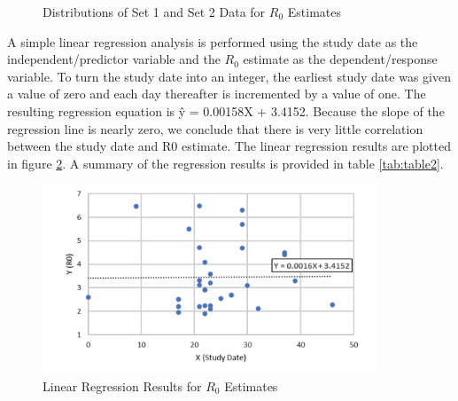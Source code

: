 \documentclass{article}
\begin{document}
\begin{figure}[!tbp]
  \centering
  \hfill
  \caption{Distributions of Set 1 and Set 2 Data for $R_0$ Estimates}
    \label{R0Hists}
\end{figure}

A simple linear regression analysis is performed using the study date as the independent/predictor variable and the $R_0$ estimate as the dependent/response variable. To turn the study date into an integer, the earliest study date was given a value of zero and each day thereafter is incremented by a value of one. The resulting regression equation is \^{y} = 0.00158X + 3.4152. Because the slope of the regression line is nearly zero, we conclude that there is very little correlation between the study date and R0 estimate. The linear regression results are plotted in figure \ref{R0Reg}. A summary of the regression results is provided in table \ref{tab:table2}.

\begin{figure}[h!]
  \centering
  \includegraphics[width=10cm]{sm5.pdf}
  \caption{Linear Regression Results for $R_0$ Estimates}
  \label{R0Reg}
\end{figure}
\end{document}
